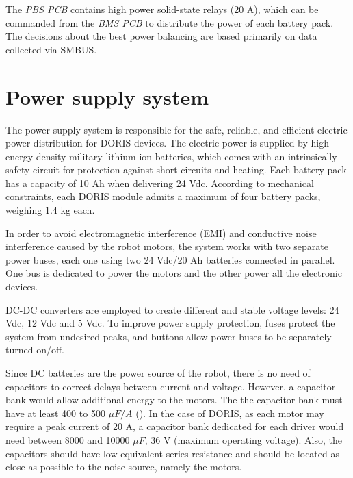 \documentclass{ifacconf}
\begin{document}
The \emph{PBS PCB} contains high power solid-state relays (20
A), which can be commanded from the \emph{BMS PCB} to distribute the power of each
battery pack. The decisions about the best power balancing are based primarily
on data collected via SMBUS.

\section{Power supply system}\label{sec:powersupply_overview}
The power supply system is responsible for the safe, reliable, and
efficient electric power distribution for DORIS devices. The electric power is
supplied by high energy density military lithium ion batteries, which comes
with an intrinsically safety circuit for protection against short-circuits and
heating. Each battery pack has a capacity of 10 Ah when delivering 24 Vdc.
According to mechanical constraints, each DORIS module admits a maximum of four battery packs, weighing 1.4 kg each.


In order to avoid electromagnetic interference (EMI) and conductive noise
interference caused by the robot motors, the system works with two separate power
buses, each one using two 24 Vdc/20 Ah batteries connected in parallel. One bus
is dedicated to power the motors and the other power all the electronic
devices.

DC-DC converters are employed to create different and stable voltage levels: 24
Vdc, 12 Vdc and 5 Vdc. To improve power supply
protection, fuses protect the system from undesired peaks, and buttons allow power
buses to be separately turned on/off.

Since DC batteries are the power source of the robot, there is no need of
capacitors to correct delays between current and voltage. However, a capacitor
bank would allow additional energy to the motors. The the capacitor bank must
have at least 400 to 500 $\mu F/A$ (\cite{capacitor}). In the case of DORIS, as
each motor may require a peak current of 20 A, a capacitor bank dedicated for
each driver would need between 8000 and 10000 $\mu F$, 36 V (maximum operating
voltage). Also, the capacitors should have low equivalent series resistance and
should be located as close as possible to the noise source, namely the motors.
\end{document}

